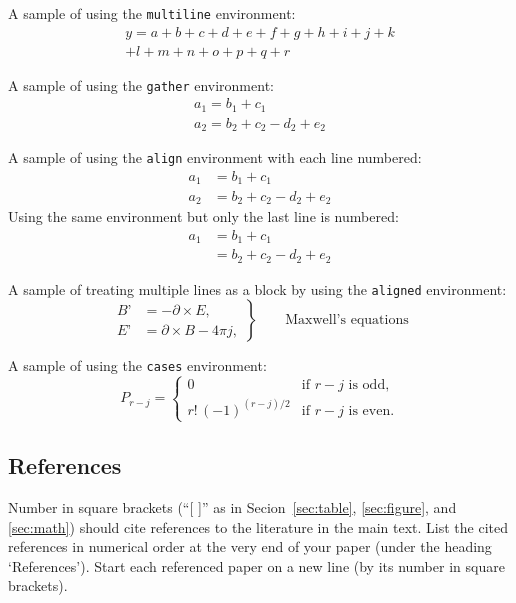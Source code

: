 \documentclass[conference]{csce}
\begin{document}
A sample of using the \texttt{multiline} environment:
\begin{multline}
y = a+b+c+d+e+f+g+h+i+j+k\\
+l+m+n+o+p+q+r
\end{multline}

A sample of using the \texttt{gather} environment:
\begin{gather}
a_1=b_1+c_1\\
a_2=b_2+c_2-d_2+e_2
\end{gather}

A sample of using the \texttt{align} environment with each line numbered:
\begin{align}
a_1& =b_1+c_1\\
a_2& =b_2+c_2-d_2+e_2
\end{align}
Using the same environment but only the last line is numbered:
\begin{align}
a_1& =b_1+c_1 \nonumber\\
   & =b_2+c_2-d_2+e_2
\end{align}


A sample of treating multiple lines as a block by using the \texttt{aligned} environment:
\begin{equation}
\left.\begin{aligned}
  B’&=-\partial\times E,\\
  E’&=\partial\times B - 4\pi j,
\end{aligned}
\right\}
\qquad \text{Maxwell's equations}
\end{equation}

A sample of using the \texttt{cases} environment:
\begin{equation}
P_{r-j}=\begin{cases}
    0& \text{if $r-j$ is odd},\\
    r!\,(-1)^{(r-j)/2}& \text{if $r-j$ is even}.
  \end{cases}
\end{equation}




\subsection{References}
Number in square brackets (``[ ]'' as in Secion~\ref{sec:table}, \ref{sec:figure}, and \ref{sec:math}) should cite references to 
the literature in the main text. List the cited references in numerical order at 
the very end of your paper (under the heading `References'). Start each 
referenced paper on a new line (by its number in square brackets).
\end{document}
